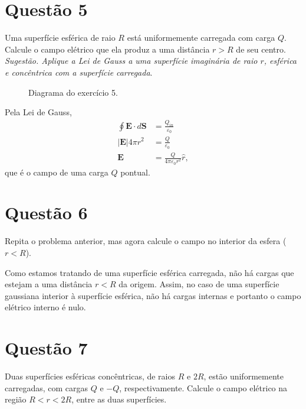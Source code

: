 \documentclass[11pt]{article}
\begin{document}
\section{Questão 5}
\label{sec:org319b7a9}
Uma superfície esférica de raio \(R\) está uniformemente carregada com
carga \(Q\). Calcule o campo elétrico que ela produz a uma distância \(r>R\)
de seu centro. \emph{Sugestão. Aplique a Lei de Gauss a uma superfície}
\emph{imaginária de raio \(r\), esférica e concêntrica com a superfície} 
\emph{carregada}.

\begin{figure}[h!]
  \centering
  \caption{Diagrama do exercício 5.}
  \label{fig:ex-5}
\end{figure}

Pela Lei de Gauss,
\begin{align*}
  \oint \mathbf E\cdot d\mathbf S &= \frac{Q_{in}}{\varepsilon_0}\\
  |\mathbf E| 4\pi r^2  &= \frac{Q}{\varepsilon_0}\\
  \mathbf E &=  \frac{Q}{4\pi\varepsilon_0r^2}\hat r,
\end{align*}
que é o campo de uma carga $Q$ pontual.
\section{Questão 6}
\label{sec:orga445a4c}
Repita o problema anterior, mas agora calcule o campo no interior da
esfera (\(r<R\)).

Como estamos tratando de uma superfície esférica carregada, não há
cargas que estejam a uma distância \(r<R\) da origem. Assim, no caso de
uma superfície gaussiana interior à superfície esférica, não há cargas
internas e portanto o campo elétrico interno é nulo.

\section{Questão 7}
\label{sec:orgb5b4621}
Duas superfícies esféricas concêntricas, de raios \(R\) e \(2R\), estão
uniformemente carregadas, com cargas \(Q\) e \(-Q\),
respectivamente. Calcule o campo elétrico na região \(R<r<2R\), entre as
duas superfícies. 
\end{document}
